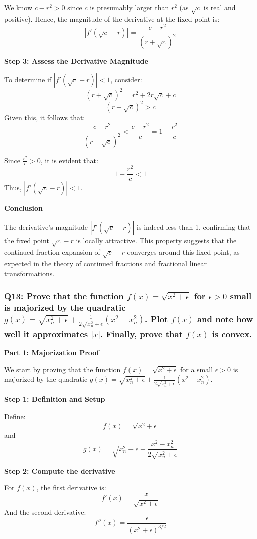 \documentclass[8pt]{article}
\begin{document}
We know \(c - r^2 > 0\) since \(c\) is presumably larger than \(r^2\) (as \(\sqrt{c}\) is real and positive). Hence, the magnitude of the derivative at the fixed point is:
\[ |f'(\sqrt{c} - r)| = \frac{c - r^2}{(r + \sqrt{c})^2} \]

\textbf{Step 3: Assess the Derivative Magnitude}

To determine if \(|f'(\sqrt{c} - r)| < 1\), consider:
\[ (r + \sqrt{c})^2 = r^2 + 2r\sqrt{c} + c \]
\[ (r + \sqrt{c})^2 > c \]
Given this, it follows that:
\[ \frac{c - r^2}{(r + \sqrt{c})^2} < \frac{c - r^2}{c} = 1 - \frac{r^2}{c} \]

Since \(\frac{r^2}{c} > 0\), it is evident that:
\[ 1 - \frac{r^2}{c} < 1 \]
Thus, \(|f'(\sqrt{c} - r)| < 1\).

\textbf{Conclusion}

The derivative's magnitude \(|f'(\sqrt{c} - r)|\) is indeed less than 1, confirming that the fixed point \(\sqrt{c} - r\) is locally attractive. This property suggests that the continued fraction expansion of \(\sqrt{c} - r\) converges around this fixed point, as expected in the theory of continued fractions and fractional linear transformations.

\subsubsection*{Q13: Prove that the function \( f(x) = \sqrt{x^2 + \epsilon} \) for \( \epsilon > 0 \) small is majorized by the quadratic \( g(x) = \sqrt{x_n^2 + \epsilon} + \frac{1}{2\sqrt{x_n^2 + \epsilon}} (x^2 - x_n^2) \). Plot \( f(x) \) and note how well it approximates \(|x|\). Finally, prove that \( f(x) \) is convex.}

\textbf{Part 1: Majorization Proof}

We start by proving that the function \( f(x) = \sqrt{x^2 + \epsilon} \) for a small \( \epsilon > 0 \) is majorized by the quadratic \( g(x) = \sqrt{x_n^2 + \epsilon} + \frac{1}{2\sqrt{x_n^2 + \epsilon}} (x^2 - x_n^2) \).

\textbf{Step 1: Definition and Setup}

Define:
\[ f(x) = \sqrt{x^2 + \epsilon} \]
and
\[ g(x) = \sqrt{x_n^2 + \epsilon} + \frac{x^2 - x_n^2}{2\sqrt{x_n^2 + \epsilon}} \]

\textbf{Step 2: Compute the derivative}

For \( f(x) \), the first derivative is:
\[ f'(x) = \frac{x}{\sqrt{x^2 + \epsilon}} \]
And the second derivative:
\[ f''(x) = \frac{\epsilon}{(x^2 + \epsilon)^{3/2}} \]
\end{document}
